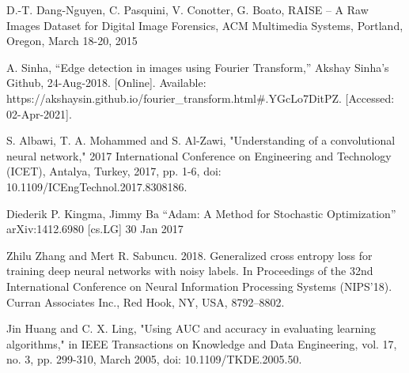 \documentclass[conference]{IEEEtran}
\begin{document}
\begin{thebibliography}{00}
D.-T. Dang-Nguyen, C. Pasquini, V. Conotter, G. Boato, RAISE – A Raw Images Dataset for Digital Image Forensics, ACM Multimedia Systems, Portland, Oregon, March 18-20, 2015

A. Sinha, “Edge detection in images using Fourier Transform,” Akshay Sinha's Github, 24-Aug-2018. [Online]. Available: https://akshaysin.github.io/fourier\_transform.html\#.YGcLo7DitPZ. [Accessed: 02-Apr-2021]. 

S. Albawi, T. A. Mohammed and S. Al-Zawi, "Understanding of a convolutional neural network," 2017 International Conference on Engineering and Technology (ICET), Antalya, Turkey, 2017, pp. 1-6, doi: 10.1109/ICEngTechnol.2017.8308186.

Diederik P. Kingma, Jimmy Ba “Adam: A Method for Stochastic Optimization” arXiv:1412.6980 [cs.LG] 30 Jan 2017

Zhilu Zhang and Mert R. Sabuncu. 2018. Generalized cross entropy loss for training deep neural networks with noisy labels. In Proceedings of the 32nd International Conference on Neural Information Processing Systems (NIPS'18). Curran Associates Inc., Red Hook, NY, USA, 8792–8802.

Jin Huang and C. X. Ling, "Using AUC and accuracy in evaluating learning algorithms," in IEEE Transactions on Knowledge and Data Engineering, vol. 17, no. 3, pp. 299-310, March 2005, doi: 10.1109/TKDE.2005.50.



\end{thebibliography}
\end{document}

